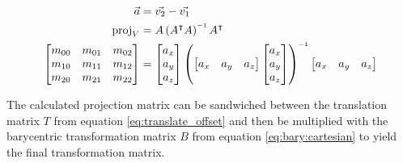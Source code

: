 \begin{align*}
    \vec{a} &= \vec{v_2} - \vec{v_1} \\
    \text{proj}_V &= A\left(A\transpose A\right)\inverse A\transpose \\
    \begin{bmatrix}
        m_{00} & m_{01} & m_{02} \\
        m_{10} & m_{11} & m_{12} \\
        m_{20} & m_{21} & m_{22} \\
    \end{bmatrix}
    &=  \begin{bmatrix}
            a_x \\
            a_y \\
            a_z \\
        \end{bmatrix}
        \left(
            \begin{bmatrix}
                a_x & a_y & a_z \\
            \end{bmatrix}
            \begin{bmatrix}
                a_x \\
                a_y \\
                a_z \\
            \end{bmatrix}
        \right)\inverse
        \begin{bmatrix}
            a_x & a_y & a_z \\
        \end{bmatrix}
\end{align*}

The  calculated  projection matrix can be  sandwiched  between  the  translation
matrix  $T$  from equation \ref{eq:translate_offset} and then be multiplied with
the  barycentric transformation matrix $B$ from equation \ref{eq:bary:cartesian}
to yield the final transformation matrix.

